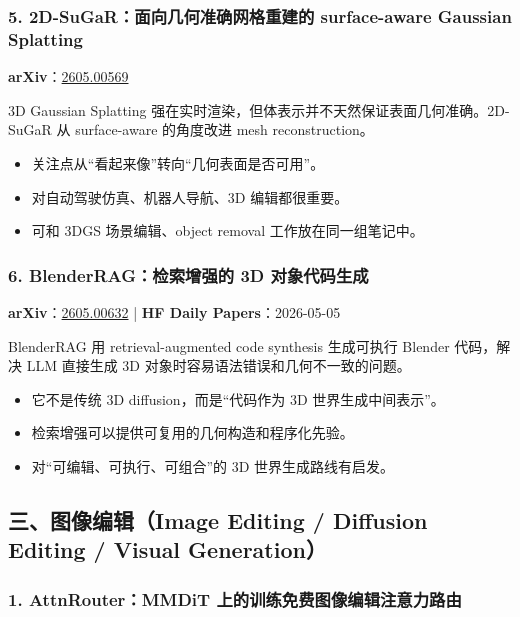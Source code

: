 \subsubsection{5. 2D-SuGaR：面向几何准确网格重建的 surface-aware Gaussian Splatting}

\textbf{arXiv}：\href{https://arxiv.org/abs/2605.00569}{2605.00569}

3D Gaussian Splatting 强在实时渲染，但体表示并不天然保证表面几何准确。2D-SuGaR 从 surface-aware 的角度改进 mesh reconstruction。

\begin{itemize}[leftmargin=1.5em]
  \item 关注点从“看起来像”转向“几何表面是否可用”。
  \item 对自动驾驶仿真、机器人导航、3D 编辑都很重要。
  \item 可和 3DGS 场景编辑、object removal 工作放在同一组笔记中。
\end{itemize}

\subsubsection{6. BlenderRAG：检索增强的 3D 对象代码生成}

\textbf{arXiv}：\href{https://arxiv.org/abs/2605.00632}{2605.00632} | \textbf{HF Daily Papers}：2026-05-05

BlenderRAG 用 retrieval-augmented code synthesis 生成可执行 Blender 代码，解决 LLM 直接生成 3D 对象时容易语法错误和几何不一致的问题。

\begin{itemize}[leftmargin=1.5em]
  \item 它不是传统 3D diffusion，而是“代码作为 3D 世界生成中间表示”。
  \item 检索增强可以提供可复用的几何构造和程序化先验。
  \item 对“可编辑、可执行、可组合”的 3D 世界生成路线有启发。
\end{itemize}

\subsection{三、图像编辑（Image Editing / Diffusion Editing / Visual Generation）}

\subsubsection{1. AttnRouter：MMDiT 上的训练免费图像编辑注意力路由}


